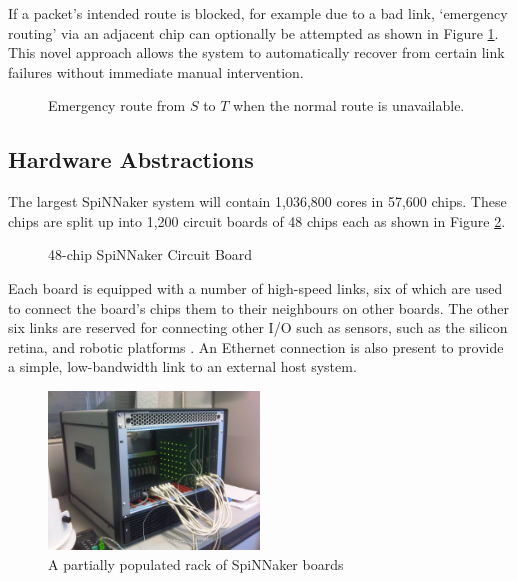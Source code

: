 				If a packet's intended route is blocked, for example due to a bad link,
				`emergency routing' via an adjacent chip can optionally be attempted as
				shown in Figure \ref{fig:emergency-routing}. This novel approach allows
				the system to automatically recover from certain link failures without
				immediate manual intervention.
				
				\begin{figure}
					\center
					
					\caption{Emergency route from $S$ to $T$ when the normal route is
					unavailable.}
					\label{fig:emergency-routing}
				\end{figure}
			
		
		\subsection{Hardware Abstractions}
			
			
			The largest SpiNNaker system will contain 1,036,800 cores in 57,600 chips.
			These chips are split up into 1,200 circuit boards of 48 chips each as
			shown in Figure \ref{fig:spinn4labelled}.
			
			\begin{figure}
				\center
				
				\caption{48-chip SpiNNaker Circuit Board}
				\label{fig:spinn4labelled}
			\end{figure}
			
			Each board is equipped with a number of high-speed links, six of which are
			used to connect the board's chips them to their neighbours on other
			boards. The other six links are reserved for connecting other I/O such as
			sensors, such as the silicon retina, and robotic platforms
			\cite{davies10}. An Ethernet connection is also present to provide a
			simple, low-bandwidth link to an external host system.
			
			\begin{figure}
				\center
				\includegraphics[width=0.5\textwidth]{figures/spiNNaker103.jpg}
				\caption{A partially populated rack of SpiNNaker boards}
				\label{fig:spiNNaker103}
			\end{figure}
			

